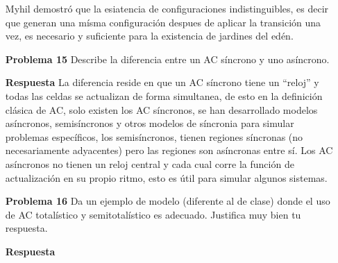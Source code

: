 \documentclass{article}
\begin{document}
\begin{enumerate}
Myhil \cite{Myhil1963} demostró que la esiatencia de configuraciones indistinguibles, es decir que generan una mísma configuración despues de aplicar la transición una vez, es necesario y suficiente para la existencia de jardines del edén.


\item[\bf{Problema 15}] Describe la diferencia entre un AC síncrono y uno asíncrono.
\item[\bf{Respuesta}] La diferencia reside en que un AC síncrono tiene un ``reloj'' y todas las celdas se actualizan de forma simultanea, de esto en la definición clásica de AC, solo existen los AC síncronos, se han desarrollado modelos asíncronos, semisíncronos y otros modelos de síncronia para simular problemas específicos, los semisíncronos, tienen regiones síncronas (no necesariamente adyacentes) pero las regiones son asíncronas entre sí. Los AC asíncronos no tienen un reloj central y cada cual corre la función de actualización en su propio ritmo, esto es útil para simular algunos sistemas.

\item[\bf{Problema 16}] Da un ejemplo de modelo (diferente al de clase) donde el uso de AC
totalístico y semitotalístico es adecuado. Justifica muy bien tu respuesta.
\item[\bf{Respuesta}]
\end{enumerate}
\end{document}
